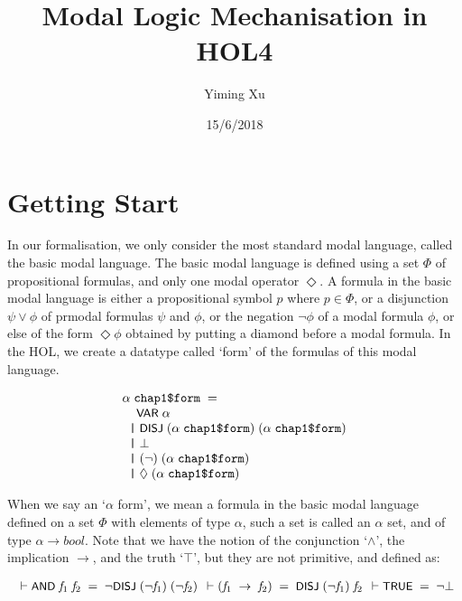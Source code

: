 \documentclass[letterpaper]{article}
\title{Modal Logic Mechanisation in HOL4}
\author{Yiming Xu}
\date{15/6/2018}
\renewcommand{\HOLConst}[1]{{\textsf{\upshape\small #1}}}
\newenvironment{holmath}{\begin{displaymath}\begin{array}{l}}{\end{array}\end{displaymath}\ignorespacesafterend}
\begin{document}
\maketitle

\section{Getting Start}

In our formalisation, we only consider the most standard modal language, called the basic modal language. The basic modal language is defined using a set $\Phi$ of propositional formulas, and only one modal operator $\Diamond$. A formula in the basic modal language is either a propositional symbol $p$ where $p\in \Phi$, or a disjunction $\psi\lor\phi$  of prmodal formulas $\psi$ and $\phi$, or the negation $\lnot \phi$ of a modal formula $\phi$, or else of the form $\Diamond \phi$ obtained by putting a diamond before a modal formula. In the HOL, we create a datatype called `form' of the formulas of this modal language. 

\begin{holmath}
  \ensuremath{\alpha}\;\HOLTyOp{chap1\$form}\;=\\
\;\;\;\;\HOLConst{VAR}\;\ensuremath{\alpha}\\
\;\;\HOLTokenBar{}\;\HOLConst{DISJ}\;(\ensuremath{\alpha}\;\HOLTyOp{chap1\$form})\;(\ensuremath{\alpha}\;\HOLTyOp{chap1\$form})\\
\;\;\HOLTokenBar{}\;\HOLSymConst{\ensuremath{\bot}}\\
\;\;\HOLTokenBar{}\;(\HOLSymConst{\HOLTokenNeg{}})\;(\ensuremath{\alpha}\;\HOLTyOp{chap1\$form})\\
\;\;\HOLTokenBar{}\;\HOLSymConst{\ensuremath{\Diamond}}\;(\ensuremath{\alpha}\;\HOLTyOp{chap1\$form})
\end{holmath}

When we say an `$\alpha$ form', we mean a formula in the basic modal language defined on a set $\Phi$ with elements of type $\alpha$, such a set is called an $\alpha$ set, and of type $\alpha \to bool$. Note that we have the notion of the conjunction `$\land$', the implication $\to$, and the truth `$\top$', but they are not primitive, and defined as:

\begin{holmath}
  \ensuremath{\HOLTokenTurnstile}\HOLConst{AND}\;\HOLFreeVar{f\sb{\mathrm{1}}}\;\HOLFreeVar{f\sb{\mathrm{2}}}\;\HOLSymConst{=}\;\HOLSymConst{\HOLTokenNeg{}}\HOLConst{DISJ}\;(\HOLSymConst{\HOLTokenNeg{}}\HOLFreeVar{f\sb{\mathrm{1}}})\;(\HOLSymConst{\HOLTokenNeg{}}\HOLFreeVar{f\sb{\mathrm{2}}})
  \ensuremath{\HOLTokenTurnstile}(\HOLFreeVar{f\sb{\mathrm{1}}}\;\HOLSymConst{\ensuremath{\rightarrow}}\;\HOLFreeVar{f\sb{\mathrm{2}}})\;\HOLSymConst{=}\;\HOLConst{DISJ}\;(\HOLSymConst{\HOLTokenNeg{}}\HOLFreeVar{f\sb{\mathrm{1}}})\;\HOLFreeVar{f\sb{\mathrm{2}}}
  \ensuremath{\HOLTokenTurnstile}\HOLConst{TRUE}\;\HOLSymConst{=}\;\HOLSymConst{\HOLTokenNeg{}}\HOLSymConst{\ensuremath{\bot}}
\end{holmath}
\end{document}
